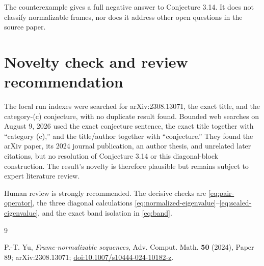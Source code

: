 \documentclass[11pt]{article}
\begin{document}
The counterexample gives a full negative answer to Conjecture 3.14.  It does
not classify normalizable frames, nor does it address other open questions in
the source paper.

\section{Novelty check and review recommendation}

The local run indexes were searched for arXiv:2308.13071, the exact title,
and the category-(c) conjecture, with no duplicate result found.  Bounded web
searches on August 9, 2026 used the exact conjecture sentence, the exact title
together with ``category (c),'' and the title/author together with
``conjecture.''  They found the arXiv paper, its 2024 journal publication, an
author thesis, and unrelated later citations, but no resolution of
Conjecture 3.14 or this diagonal-block construction.  The result's novelty is
therefore plausible but remains subject to expert literature review.

Human review is strongly recommended.  The decisive checks are
\eqref{eq:pair-operator}, the three diagonal calculations
\eqref{eq:normalized-eigenvalue}--\eqref{eq:scaled-eigenvalue}, and the exact
band isolation in \eqref{eq:band}.

\begin{thebibliography}{9}
\raggedright
{}
P.-T. Yu,
\emph{Frame-normalizable sequences},
Adv. Comput. Math. \textbf{50} (2024), Paper 89;
arXiv:2308.13071;
\href{https://doi.org/10.1007/s10444-024-10182-z}{doi:10.1007/s10444-024-10182-z}.
\end{thebibliography}
\end{document}
